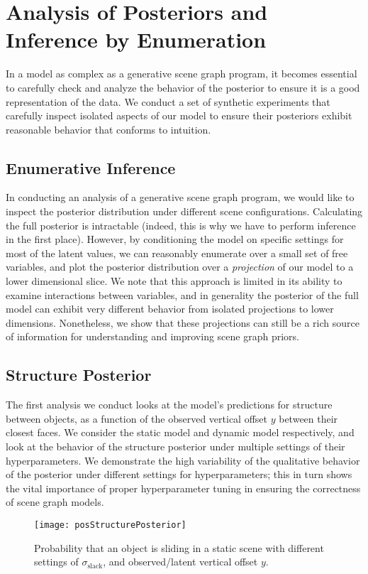 \chapter{Analysis of Posteriors and Inference by Enumeration}

In a model as complex as a generative scene graph program, it becomes essential to carefully check and analyze the behavior of the posterior to ensure it is a good representation of the data.
We conduct a set of synthetic experiments that carefully inspect isolated aspects of our model to ensure their posteriors exhibit reasonable behavior that conforms to intuition.

\section{Enumerative Inference}
In conducting an analysis of a generative scene graph program, we would like to inspect the posterior distribution under different scene configurations.
Calculating the full posterior is intractable (indeed, this is why we have to perform inference in the first place).
However, by conditioning the model on specific settings for most of the latent values, we can reasonably enumerate over a small set of free variables, and plot the posterior distribution over a \textit{projection} of our model to a lower dimensional slice.
We note that this approach is limited in its ability to examine interactions between variables, and in generality the posterior of the full model can exhibit very different behavior from isolated projections to lower dimensions.
Nonetheless, we show that these projections can still be a rich source of information for understanding and improving scene graph priors.

\section{Structure Posterior}
The first analysis we conduct looks at the model's predictions for structure between objects, as a function of the observed vertical offset $y$ between their closest faces.
We consider the static model and dynamic model respectively, and look at the behavior of the structure posterior under multiple settings of their hyperparameters.
We demonstrate the high variability of the qualitative behavior of the posterior under different settings for hyperparameters; this in turn shows the vital importance of proper hyperparameter tuning in ensuring the correctness of scene graph models.
\begin{figure}[h]
  \centering
  \texttt{[image: posStructurePosterior]}
  \caption{
    Probability that an object is sliding in a static scene with different settings of $\sigma_\mathrm{slack}$, and observed/latent vertical offset $y$.
  }
  \label{fig:posStructurePosterior}
\end{figure}

